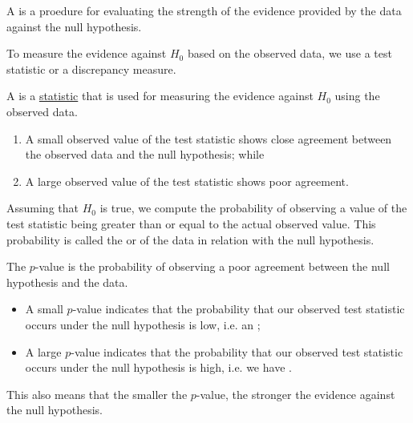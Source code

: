 \documentclass[notoc,notitlepage]{tufte-book}
\begin{document}
\begin{defn}
\label{defn:test_of_hypothesis}
  A  is a proedure for evaluating the strength of the evidence provided by the data against the null hypothesis.
\end{defn}

To measure the evidence against $H_0$ based on the observed data, we use a test statistic or a discrepancy measure.

\begin{defn}
\label{defn:test_statistic}
  A  is a \hyperref[defn:statistic]{statistic} that is used for measuring the evidence against $H_0$ using the observed data.
\end{defn}

\begin{note}
  \begin{enumerate}
    \item A small observed value of the test statistic shows close agreement between the observed data and the null hypothesis; while
    \item A large observed value of the test statistic shows poor agreement. 
  \end{enumerate}
\end{note}

\begin{defn}
\label{defn:significance_level_and_p_values}
  Assuming that $H_0$ is true, we compute the probability of observing a value of the test statistic being greater than or equal to the actual observed value. This probability is called the  or  of the data in relation with the null hypothesis.
\end{defn}

\begin{note}
  The $p$-value is the probability of observing a poor agreement between the null hypothesis and the data.
  \begin{itemize}
    \item A small $p$-value indicates that the probability that our observed test statistic occurs under the null hypothesis is low, i.e. an ;
    \item A large $p$-value indicates that the probability that our observed test statistic occurs under the null hypothesis is high, i.e. we have .
  \end{itemize}
  This also means that the smaller the $p$-value, the stronger the evidence against the null hypothesis.
\end{note}
\end{document}
